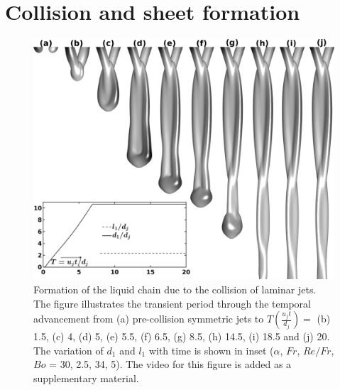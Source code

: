 \documentclass[%
 aip,
 sd,%
amsmath,amssymb,
preprint,%
author-year,%
]{revtex4-1}
\begin{document}
\section{Collision and sheet formation}
\begin{figure}
	\centering
	\includegraphics[width=\linewidth]{Figure4}
	\caption{Formation of the liquid chain due to the collision of laminar jets. The figure illustrates the transient period through the temporal advancement from (a) pre-collision symmetric jets to $T (\frac{u_jt}{d_j}) = $ (b) 1.5, (c) 4, (d) 5, (e) 5.5, (f) 6.5, (g) 8.5, (h) 14.5, (i) 18.5  and (j) 20. The variation of $d_1$ and $l_1$ with time is shown in inset ($\alpha$, $Fr$, $Re/Fr$, $Bo$ = 30\degree, 2.5, 34, 5). The video for this figure is added as a supplementary material.}
	\label{Figure::temporal}
\end{figure}
\end{document}
